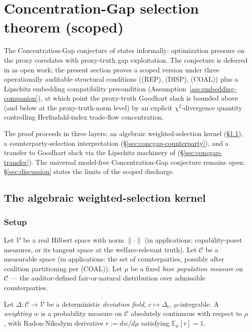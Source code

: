 \section{Concentration-Gap selection theorem (scoped)}
\label{sec:concgap}

The Concentration-Gap conjecture of
\citep[Microfoundation]{lasser2026micro} states informally:
optimization pressure on the proxy correlates with proxy-truth
gap exploitation. The conjecture is deferred in
\citep{lasser2026micro} as open work; the present section proves
a scoped version under three operationally auditable structural
conditions ((REP), (DISP), (COAL)) plus a Lipschitz embedding
compatibility precondition (Assumption~\ref{ass:embedding-companion}),
at which point the proxy-truth Goodhart slack is bounded above
(and below at the proxy-truth-norm level) by an explicit
$\chi^2$-divergence quantity controlling Herfindahl-index
trade-flow concentration.

The proof proceeds in three layers: an algebraic
weighted-selection kernel (\S\ref{sec:concgap-algebraic}), a
counterparty-selection interpretation
(\S\ref{sec:concgap-counterparty}), and a transfer to Goodhart
slack via the Lipschitz machinery of
\citep[Theorem~2]{lasser2026micro}
(\S\ref{sec:concgap-transfer}). The universal model-free
Concentration-Gap conjecture remains open;
\S\ref{sec:discussion} states the limits of the scoped discharge.

\subsection{The algebraic weighted-selection kernel}
\label{sec:concgap-algebraic}

\subsubsection{Setup}

Let $\mathcal{V}$ be a real Hilbert space with norm $\|\cdot\|$
(in applications: capability-poset measures, or its tangent space
at the welfare-relevant truth). Let $\mathcal{C}$ be a measurable
space (in applications: the set of counterparties, possibly after
coalition partitioning per (COAL)). Let $\mu$ be a fixed
\emph{base population measure} on $\mathcal{C}$ --- the
auditor-defined fair-or-natural distribution over admissible
counterparties.

Let $\Delta: \mathcal{C} \to \mathcal{V}$ be a deterministic
\emph{deviation field}, $c \mapsto \Delta_c$, $\mu$-integrable. A
\emph{weighting} $w$ is a probability measure on $\mathcal{C}$
absolutely continuous with respect to $\mu$, with Radon-Nikodym
derivative $r := dw/d\mu$ satisfying $\mathbb{E}_\mu[r] = 1$.

